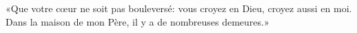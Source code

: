 \encetemps \jesusdisciples
	«Que votre cœur ne soit pas bouleversé:
	vous croyez en Dieu, croyez aussi en moi.
Dans la maison de mon Père, il y a de nombreuses demeures.»
